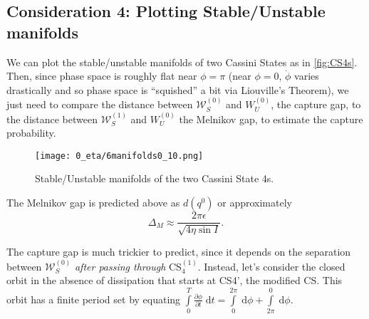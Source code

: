 \documentclass[11pt,
        usenames, %
        dvipsnames %
    ]{article}
\newcommand*{\pd}[2]{\frac{\partial#1}{\partial#2}}
\begin{document}
\subsection{Consideration 4: Plotting Stable/Unstable
manifolds}\label{ss:melnikov_success}

We can plot the stable/unstable manifolds of two Cassini States as in
\autoref{fig:CS4s}. Then, since phase space is roughly flat near $\phi = \pi$
(near $\phi = 0$, $\dot{\phi}$ varies drastically and so phase space is
``squished'' a bit via Liouville's Theorem), we just need to compare the
distance between $\mathcal{W}^{(0)}_S$ and $W_U^{(0)}$, the capture gap, to the
distance between $\mathcal{W}^{(1)}_S$ and $W_U^{(0)}$ the Melnikov gap, to
estimate the capture probability.
\begin{figure}[t]
    \centering
    \texttt{[image: 0\_eta/6manifolds0\_10.png]}
    \caption{Stable/Unstable manifolds of the two Cassini State
    4s.}\label{fig:CS4s}
\end{figure}

The Melnikov gap is predicted above as $d(q^0)$ or approximately
\begin{equation}
    \Delta_{M} \approx \frac{2\pi \epsilon}{\sqrt{4\eta\sin I}}.
\end{equation}

The capture gap is much trickier to predict, since it depends on the separation
between $\mathcal{W}^{(0)}_S$ \emph{after passing through} CS$_4^{(1)}$.
Instead, let's consider the closed orbit in the absence of dissipation that
starts at CS4', the modified CS\@. This orbit has a finite period set by
equating $\int\limits_0^T \pd{\phi}{t}\;\mathrm{d}t =
\int\limits_0^{2\pi}\;\mathrm{d}\phi + \int\limits_{2\pi}^0\;\mathrm{d}\phi$.
\end{document}
